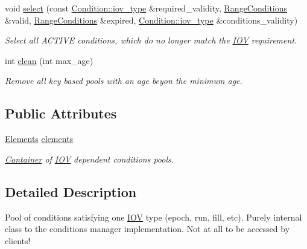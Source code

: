 \begin{DoxyCompactItemize}
void \hyperlink{class_d_d4hep_1_1_conditions_1_1_conditions_i_o_v_pool_ae7ff2198bcdc12e8be275d1aacc5cd0b}{select} (const \hyperlink{class_d_d4hep_1_1_i_o_v}{Condition::iov\_\-type} \&required\_\-validity, \hyperlink{namespace_d_d4hep_1_1_conditions_ae765f0140a33973a430280f02b6062f4}{RangeConditions} \&valid, \hyperlink{namespace_d_d4hep_1_1_conditions_ae765f0140a33973a430280f02b6062f4}{RangeConditions} \&expired, \hyperlink{class_d_d4hep_1_1_i_o_v}{Condition::iov\_\-type} \&conditions\_\-validity)
\begin{DoxyCompactList}\small\item\em Select all ACTIVE conditions, which do no longer match the \hyperlink{class_d_d4hep_1_1_i_o_v}{IOV} requirement. \item\end{DoxyCompactList}\item 
int \hyperlink{class_d_d4hep_1_1_conditions_1_1_conditions_i_o_v_pool_a3adc9fa6a89d3195b91b5fb11236f360}{clean} (int max\_\-age)
\begin{DoxyCompactList}\small\item\em Remove all key based pools with an age beyon the minimum age. \item\end{DoxyCompactList}\end{DoxyCompactItemize}
\subsection*{Public Attributes}
\begin{DoxyCompactItemize}
\item 
\hyperlink{class_d_d4hep_1_1_conditions_1_1_conditions_i_o_v_pool_aa011c5cc19bfb761be62adf9a88b5ee9}{Elements} \hyperlink{class_d_d4hep_1_1_conditions_1_1_conditions_i_o_v_pool_adf0b418e513769d438a8c91d766e86f4}{elements}
\begin{DoxyCompactList}\small\item\em \hyperlink{class_d_d4hep_1_1_conditions_1_1_container}{Container} of \hyperlink{class_d_d4hep_1_1_i_o_v}{IOV} dependent conditions pools. \item\end{DoxyCompactList}\end{DoxyCompactItemize}


\subsection{Detailed Description}
Pool of conditions satisfying one \hyperlink{class_d_d4hep_1_1_i_o_v}{IOV} type (epoch, run, fill, etc). Purely internal class to the conditions manager implementation. Not at all to be accessed by clients!

